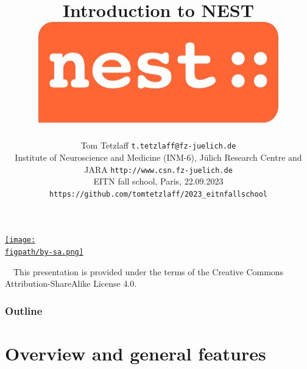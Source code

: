 \documentclass[8pt,t,usepdftitle=false]{beamer}
\title{%
  {\LARGE\bf Introduction to NEST}
  \hfill\includegraphics[width=0.15\linewidth]{./figures/nest-logo}\\[1ex]
}
\subtitle{%
  {\normalsize\mdseries Tom Tetzlaff}%
  {\hfill\tiny\texttt{t.tetzlaff@fz-juelich.de}}\\  
  {\footnotesize\mdseries Institute of Neuroscience and Medicine (INM-6), J\"ulich Research Centre and JARA}
  {\hfill\tiny\texttt{http://www.csn.fz-juelich.de}}
  \\
  {\tiny\mdseries EITN fall school, Paris, 22.09.2023}
  {\hfill\tiny\texttt{https://github.com/tomtetzlaff/2023\_eitnfallschool}}
}
\date{}
\author{}
\institute{}
\def\figpath{./figures}
\begin{document}
\maketitle

\begin{frame}[plain]
  \begin{center}
    \parbox{0.9\linewidth}{
      \vspace{0.95\textheight}
      \parbox[c]{0.1\linewidth}{%
        \href{https://creativecommons.org/licenses/by-sa/4.0}{%
          \texttt{[image: \\figpath/by-sa.png]}}}
      \parbox[c]{0.9\linewidth}{\scriptsize%
        ~~{}This presentation is provided under the terms of the Creative Commons Attribution-ShareAlike License 4.0.
      }
    }    
  \end{center}
\end{frame}
\def\ttl{Outline}
\begin{frame}[plain]
  \frametitle{\ttl}
  \tableofcontents
\end{frame}
\def\ttl{Overview and general features}\section{\ttl}
\end{document}
